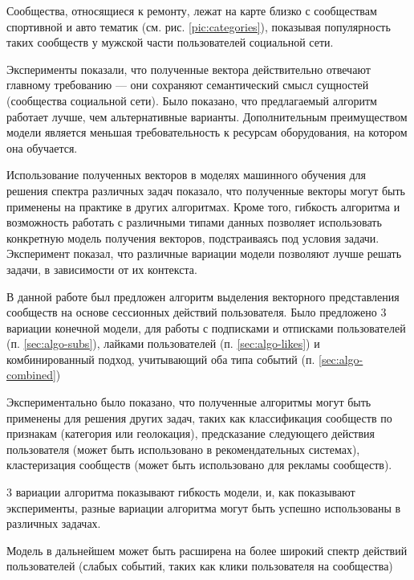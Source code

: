 \documentclass[times,specification,annotation]{itmo-student-thesis}
\begin{document}
Сообщества, относящиеся к ремонту, лежат на карте близко с сообществам спортивной и авто тематик (см. рис. \ref{pic:categories}), показывая популярность таких сообществ у мужской части пользователей социальной сети.    

\chapterconclusion

Эксперименты показали, что полученные вектора действительно отвечают главному требованию --- они сохраняют семантический смысл сущностей (сообщества социальной сети). Было показано, что предлагаемый алгоритм работает лучше, чем альтернативные варианты. Дополнительным преимуществом модели является меньшая требовательность к ресурсам оборудования, на котором она обучается. 

Использование полученных векторов в моделях машинного обучения для решения спектра различных задач показало, что полученные векторы могут быть применены на практике в других алгоритмах. Кроме того, гибкость алгоритма и возможность работать с различными типами данных позволяет использовать конкретную модель получения векторов, подстраиваясь под условия задачи. Эксперимент показал, что различные вариации модели позволяют лучше решать задачи, в зависимости от их контекста. 


\startconclusionpage

В данной работе был предложен алгоритм выделения векторного представления сообществ на основе сессионных действий пользователя. Было предложено 3 вариации конечной модели, для работы с подписками и отписками пользователей (п. \ref{sec:algo-subs}), лайками пользователей (п. \ref{sec:algo-likes}) и комбинированный подход, учитывающий оба типа событий (п. \ref{sec:algo-combined})

Экспериментально было показано, что полученные алгоритмы могут быть применены для решения других задач, таких как классификация сообществ по признакам (категория или геолокация), предсказание следующего действия пользователя (может быть использовано в рекомендательных системах), кластеризация сообществ (может быть использовано для рекламы сообществ).

3 вариации алгоритма показывают гибкость модели, и, как показывают эксперименты, разные вариации алгоритма могут быть успешно использованы в различных задачах. 

Модель в дальнейшем может быть расширена на более широкий спектр действий пользователей (слабых событий, таких как клики пользователя на сообщества) 

\printmainbibliography

\appendix
\end{document}
